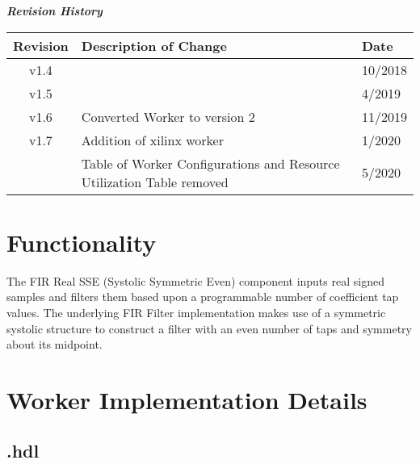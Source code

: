 %

\begin{center}
	\textit{\textbf{Revision History}}
		\begin{table}[H]
		\label{table:revisions} %
			\begin{tabularx}{\textwidth}{|c|X|l|}
			\hline
			\rowcolor{blue}
			\textbf{Revision} & \textbf{Description of Change} & \textbf{Date} \\
		    \hline
		    v1.4 & & 10/2018 \\
		    \hline
       	 	v1.5 &  & 4/2019 \\
		    \hline
		     v1.6 & Converted Worker to version 2 & 11/2019 \\
		    \hline
        		v1.7 & Addition of xilinx worker & 1/2020 \\
        		    & Table of Worker Configurations and Resource Utilization Table removed & 5/2020 \\
              \hline
			\end{tabularx}
		\end{table}
\end{center}
\newpage

\def\name{\comp}
\def\workertype{Application}
\def\version{\ocpiversion}
\def\releasedate{11/2019}
\def\componentlibrary{ocpi.assets.dsp\_{}comps}
\def\workers{\comp{}.hdl}
\def\testedplatforms{CentOS7, isim, xsim}


\section*{Functionality}
\begin{flushleft}
	The FIR Real SSE (Systolic Symmetric Even) component inputs real signed samples and filters them based upon a programmable number of coefficient tap values. The underlying FIR Filter implementation makes use of a symmetric systolic structure to construct a filter with an even number of taps and symmetry about its midpoint.
\end{flushleft}

\section*{Worker Implementation Details}
\subsection*{\comp.hdl}
